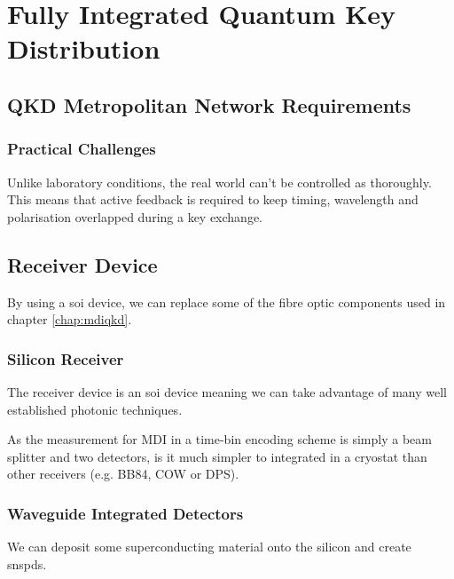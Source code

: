 %
% 
\graphicspath{{./chapters/chapter05/fig05/}}

\let\textcircled=\pgftextcircled
\chapter{Fully Integrated Quantum Key Distribution}
\label{chap:node}

\section{QKD Metropolitan Network Requirements}
\label{sec:sec05}

\subsection{Practical Challenges}

Unlike laboratory conditions, the real world can't be controlled as thoroughly. This means that active feedback is required to keep timing, wavelength and polarisation overlapped during a key exchange. 

\section{Receiver Device}

By using a \ac{soi} device, we can replace some of the fibre optic components used in chapter \ref{chap:mdiqkd}.

\subsection{Silicon Receiver}

The receiver device is an \ac{soi} device meaning we can take advantage of many well established photonic techniques.

As the measurement for \ac{MDI} in a time-bin encoding scheme is simply a beam splitter and two detectors, is it much simpler to integrated in a cryostat than other receivers (e.g. BB84, COW or DPS).

\subsection{Waveguide Integrated Detectors}

We can deposit some superconducting material onto the silicon and create \acp{snspd}. 

